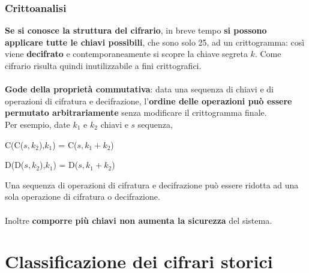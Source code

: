 \documentclass[10pt]{book}
\begin{document}
\subsubsection{Crittoanalisi}
\textbf{Se si conosce la struttura del cifrario}, in breve tempo \textbf{si possono applicare tutte le chiavi possibili}, che sono solo 25, ad un crittogramma: così viene \textbf{decifrato} e contemporaneamente si scopre la chiave segreta $k$.
Come cifrario risulta quindi inutilizzabile a fini crittografici.\\\\
\textbf{Gode della proprietà commutativa}: data una sequenza di chiavi e di operazioni di cifratura e decifrazione, l'\textbf{ordine delle operazioni può essere permutato arbitrariamente} senza modificare il crittogramma finale.\\
Per esempio, date $k_1$ e $k_2$ chiavi e $s$ sequenza,
\begin{list}{}{}
	\item C(C($s,k_2$),$k_1$) = C($s, k_1 + k_2$)
	\item D(D($s,k_2$),$k_1$) = D($s, k_1 + k_2$)
\end{list}
Una sequenza di operazioni di cifratura e decifrazione può essere ridotta ad una sola operazione di cifratura o decifrazione.\\\\
Inoltre \textbf{comporre più chiavi non aumenta la sicurezza} del sistema.
\section{Classificazione dei cifrari storici}
\end{document}
